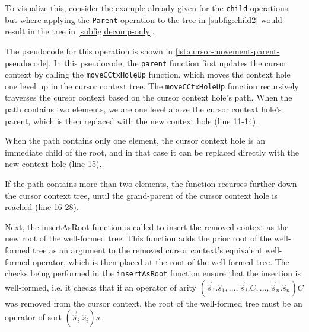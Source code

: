 To visualize this, consider the example already given for the \texttt{child} operations, but where applying the \texttt{Parent} operation to the tree in \cref{subfig:child2} would result in the tree in \cref{subfig:decomp-only}.

The pseudocode for this operation is shown in
\cref{lst:cursor-movement-parent-pseudocode}.
In this pseudocode, the \texttt{parent} function first updates the cursor
context by calling the \texttt{moveCCtxHoleUp} function, which moves the
context hole one level up in the cursor context tree.
The \texttt{moveCCtxHoleUp} function recursively traverses the cursor
context based on the cursor context hole's path. When the path contains
two elements, we are one level above the cursor context hole's parent, which
is then replaced with the new context hole (line 11-14).

When the path contains only one element, the cursor context hole is an immediate child of the root, and in that case it can be replaced directly
with the new context hole (line 15).

If the path contains more than two elements, the function recurses further
down the cursor context tree, until the grand-parent of the cursor context hole
is reached (line 16-28).

Next, the insertAsRoot function is called to insert the removed context as the
new root of the well-formed tree. This function adds the prior root of the
well-formed tree as an argument to the removed cursor context's equivalent
well-formed operator, which is then placed at the root of the well-formed tree.
The checks being performed in the \texttt{insertAsRoot} function ensure that the
insertion is well-formed, i.e. it checks that if an operator of arity $(\vec{\hat{s}}_1.\hat{s}_1,...,\vec{\hat{s}}_i.C,...,\vec{\hat{s}}_n.\hat{s}_n)C$ was removed from the cursor context, the root of the well-formed tree must be an operator of sort $(\vec{\hat{s}}_i.\hat{s}_i)\dot{s}$.

